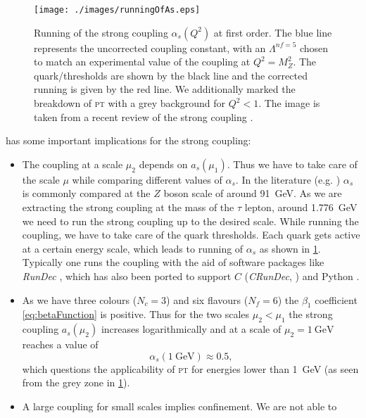 \documentclass[../../index.tex]{subfiles}
\begin{document}
\begin{figure}
  \centering \texttt{[image: ./images/runningOfAs.eps]}
  \caption{Running of the strong coupling \(\alpha_s(Q^2)\) at first order. The
    blue line represents the uncorrected coupling constant, with an
    \(\Lambda^{nf=5}\) chosen to match an experimental value of the coupling at
    \(Q^2=M_Z^2\). The quark\-/thresholds are shown by the black line and the
    corrected running is given by the red line. We additionally marked the
    breakdown of \textsc{pt} with a grey background for \(Q^2<1\). The image is
    taken from a recent review of the strong coupling \cite{Deur2016}.}
  \label{fig:runningOfAs}
\end{figure}

 has some important implications for the
strong coupling:
\begin{itemize}
\item The coupling at a scale \(\mu_2\) depends on \(a_s(\mu_1)\). Thus we have
  to take care of the scale \(\mu\) while comparing different values of
  \(\alpha_s\). In the literature (e.g. \cite{PDG2018}) \(\alpha_s\) is commonly
  compared at the \(Z\) boson scale of around \SI{91}{\giga\eV}. As we are
  extracting the strong coupling at the mass of the \(\tau\) lepton, around
  \SI{1.776}{\giga\eV} we need to run the strong coupling up to the desired
  scale. While running the coupling, we have to take care of the quark
  thresholds. Each quark gets active at a certain energy scale, which leads to
  running of \(\alpha_s\) as shown in \cref{fig:runningOfAs}. Typically one runs
  the coupling with the aid of software packages like \textit{RunDec}
  \cite{Chetyrkin2000,Herren2017}, which has also been ported to support \(C\)
  (\textit{CRunDec}, \cite{Schmidt2012}) and Python \cite{Straub2016}.
\item As we have three colours (\(N_c=3\)) and six flavours (\(N_f=6\)) the
  \(\beta_1\) coefficient \ref{eq:betaFunction} is positive. Thus for the two
  scales \(\mu_2<\mu_1\) the strong coupling \(a_s(\mu_2)\) increases
  logarithmically and at a scale of \(\mu_2=\SI{1}{\giga\eV}\) reaches a value
  of
  \begin{equation}
    \alpha_s(\SI{1}{\giga\eV}) \approx 0.5,
  \end{equation}
  which questions the applicability of \textsc{pt} for energies lower than
  \SI{1}{\giga\eV} (as seen from the grey zone in \cref{fig:runningOfAs}).
\item A large coupling for small scales implies confinement. We are not able to

\end{itemize}
\end{document}
